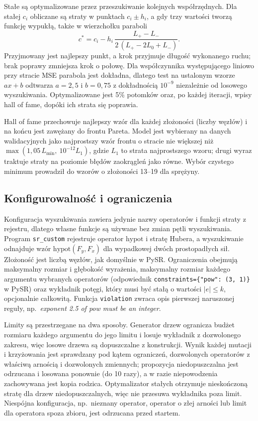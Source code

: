 \documentclass[11pt,a4paper]{article}
\begin{document}
Stałe są optymalizowane przez przeszukiwanie kolejnych współrzędnych. Dla
stałej $c_i$ obliczane są straty w punktach $c_i\pm h_i$, a gdy trzy wartości
tworzą funkcję wypukłą, także w wierzchołku paraboli
\[
c^* = c_i - h_i\,\frac{L_+ - L_-}{2\,(L_+ - 2L_0 + L_-)}.
\]
Przyjmowany jest najlepszy punkt, a krok przyjmuje długość wykonanego ruchu;
brak poprawy zmniejsza krok o połowę. Dla współczynnika występującego liniowo
przy stracie MSE parabola jest dokładna, dlatego test na ustalonym wzorze
$a x + b$ odtwarza $a=2{,}5$ i $b=0{,}75$ z dokładnością $10^{-9}$ niezależnie
od losowego wyszukiwania. Optymalizowane jest 5\% potomków oraz, po każdej
iteracji, wpisy hall of fame, dopóki ich strata się poprawia.

Hall of fame przechowuje najlepszy wzór dla każdej złożoności (liczby węzłów)
i na końcu jest zawężany do frontu Pareta. Model jest wybierany na danych
walidacyjnych jako najprostszy wzór frontu o stracie nie większej niż
$\max(1{,}05\,L_{\min},\ 10^{-12} L_1)$, gdzie $L_1$ to strata najprostszego wzoru;
drugi wyraz traktuje straty na poziomie błędów zaokrągleń jako równe.
Wybór czystego minimum prowadził do wzorów o złożoności 13--19 dla sprężyny.

\subsection{Konfigurowalność i ograniczenia}
Konfiguracja wyszukiwania zawiera jedynie nazwy operatorów i funkcji straty
z rejestru, dlatego własne funkcje są używane bez zmian pętli wyszukiwania.
Program \texttt{sr\_custom} rejestruje operator $\mathrm{hypot}$ i stratę Hubera,
a wyszukiwanie odnajduje wzór $\mathrm{hypot}(F_y, F_x)$ dla wypadkowej dwóch
prostopadłych sił. Złożoność jest liczbą węzłów, jak domyślnie w PySR.
Ograniczenia obejmują maksymalny rozmiar i głębokość wyrażenia, maksymalny
rozmiar każdego argumentu wybranych operatorów (odpowiednik
\texttt{constraints=\{"pow": (3, 1)\}} w PySR) oraz wykładnik potęgi, który
musi być stałą o wartości $|e|\le k$, opcjonalnie całkowitą. Funkcja
\texttt{violation} zwraca opis pierwszej naruszonej reguły, np.\
\emph{exponent 2.5 of pow must be an integer}.

Limity są przestrzegane na dwa sposoby. Generator drzew ogranicza budżet
rozmiaru każdego argumentu do jego limitu i losuje wykładnik z dozwolonego
zakresu, więc losowe drzewa są dopuszczalne z konstrukcji. Wynik każdej
mutacji i krzyżowania jest sprawdzany pod kątem ograniczeń, dozwolonych
operatorów z właściwą arnością i dozwolonych zmiennych; propozycja
niedopuszczalna jest odrzucana i losowana ponownie (do 10 razy), a w razie
niepowodzenia zachowywana jest kopia rodzica. Optymalizator stałych otrzymuje
nieskończoną stratę dla drzew niedopuszczalnych, więc nie przesuwa wykładnika
poza limit. Niespójna konfiguracja, np.\ nieznany operator, operator o złej
arności lub limit dla operatora spoza zbioru, jest odrzucana przed startem.
\end{document}
